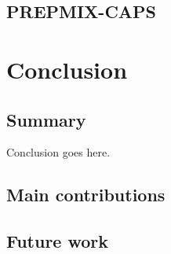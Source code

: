 \documentclass{statsmsc}
\begin{document}
\section{PREPMIX-CAPS}%
\label{sec:PREPMIX-CAPS}



\chapter{Conclusion} %

\section{Summary}%
\label{sec:Summary}



Conclusion goes here. 




\section{Main contributions}%
\label{sec:Main contributions}



\section{Future work}%
\label{sec:Future work}


\clearpage
\renewcommand*{\thepage}{A\arabic{page}}

%
%






\end{document}

